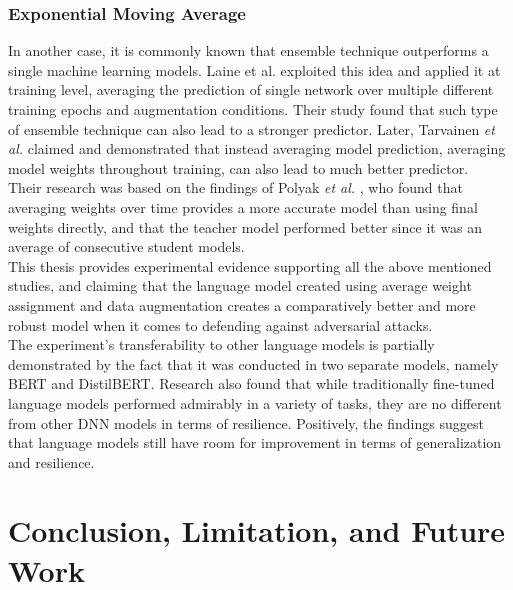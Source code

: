 \documentclass[%
	BCOR=8mm, %
	DIV=12,
	toc=bibliography, %
	toc=listof, %
	oneside, %
	egregdoesnotlikesansseriftitles, %
	]{scrbook}
\begin{document}
\subsection{Exponential Moving Average}
In another case, it is commonly known that ensemble technique outperforms a single machine learning models. Laine et al. \cite{laine_temporal_2017} exploited this idea and applied it at training level, averaging the prediction of single network over multiple different training epochs and augmentation conditions. Their study found that such type of ensemble technique can also lead to a stronger predictor. Later,  Tarvainen \textit{et al.} \cite{tarvainen_mean_2018} claimed and demonstrated that instead averaging model prediction, averaging model weights throughout training, can also lead to much better predictor. \\
Their research was based on the findings of Polyak \textit{et al.} \cite{polyak_acceleration_1992}, who found that averaging weights over time provides a more accurate model than using final weights directly, and that the teacher model performed better since it was an average of consecutive student models. \\
This thesis provides experimental evidence supporting all the above mentioned studies, and claiming that the language model created using average weight assignment and data augmentation creates a comparatively better and more robust model when it comes to defending against adversarial attacks.\\
The experiment's transferability to other language models is partially demonstrated by the fact that it was conducted in two separate models, namely BERT and DistilBERT. Research also found that while traditionally fine-tuned language models performed admirably in a variety of tasks, they are no different from other DNN models in terms of resilience. Positively, the findings suggest that language models still have room for improvement in terms of generalization and resilience.
\chapter{Conclusion, Limitation, and Future Work}
\label{chapter:conclusion}
\end{document}
